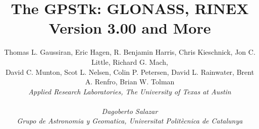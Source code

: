 \documentclass[letterpaper,ugly,10pt]{ion-gps}
\title{\huge\bf The GPSTk: GLONASS, RINEX Version 3.00 and More }
\author{Thomas L. Gaussiran, Eric Hagen, R. Benjamin Harris, Chris Kieschnick, Jon C. Little,  Richard G. Mach, \\
David C. Munton, Scot L. Nelsen, Colin P. Petersen, David L. Rainwater, Brent A. Renfro, Brian W. Tolman \\
       \it{Applied Research Laboratories, The University of Texas at Austin} \\
	\\
	Dagoberto Salazar \\
	\it{Grupo de Astronomia y Geomatica, Universitat Polit\`{e}cnica de Catalunya} }
\date{}
\begin{document}
\def\figurename{Fig.}
\def\tablename{Table}

\pagestyle{plain} %

\maketitle












%

%
%



\nocite{ion:gnss04}
\nocite{rinex2format,rinex300format}
\nocite{isgps}




\end{document}
